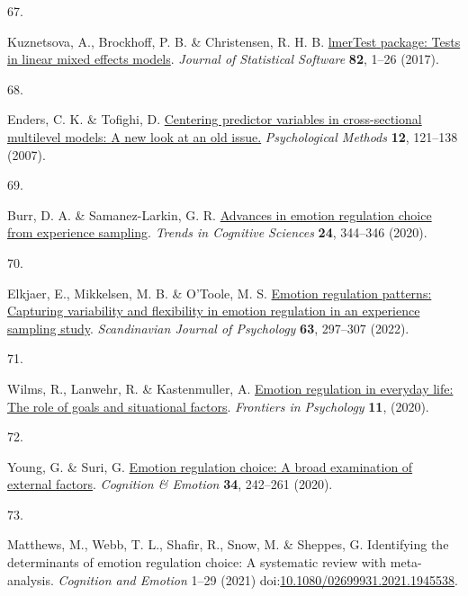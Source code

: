 \documentclass[
  man,floatsintext]{apa6}
\newlength{\cslhangindent}
\newlength{\csllabelwidth}
\newlength{\cslentryspacingunit} %
\newenvironment{CSLReferences}[2] %
 {%
  \setlength{\parindent}{0pt}
  \ifodd #1
  \let\oldpar\par
  \def\par{\hangindent=\cslhangindent\oldpar}
  \fi
  \setlength{\parskip}{#2\cslentryspacingunit}
 }%
 {}
\newcommand{\CSLLeftMargin}[1]{\parbox[t]{\csllabelwidth}{#1}}
\newcommand{\CSLRightInline}[1]{\parbox[t]{\linewidth - \csllabelwidth}{#1}\break}
\begin{document}
\begin{CSLReferences}{0}{0}
\leavevmode{}%
\CSLLeftMargin{67. }%
\CSLRightInline{Kuznetsova, A., Brockhoff, P. B. \& Christensen, R. H. B. \href{https://doi.org/10.18637/jss.v082.i13}{{lmerTest} package: Tests in linear mixed effects models}. \emph{Journal of Statistical Software} \textbf{82}, 1--26 (2017).}

\leavevmode{}%
\CSLLeftMargin{68. }%
\CSLRightInline{Enders, C. K. \& Tofighi, D. \href{https://doi.org/10.1037/1082-989x.12.2.121}{Centering predictor variables in cross-sectional multilevel models: {A} new look at an old issue.} \emph{Psychological Methods} \textbf{12}, 121--138 (2007).}

\leavevmode{}%
\CSLLeftMargin{69. }%
\CSLRightInline{Burr, D. A. \& Samanez-Larkin, G. R. \href{https://doi.org/10.1016/j.tics.2020.02.008}{Advances in emotion regulation choice from experience sampling}. \emph{Trends in Cognitive Sciences} \textbf{24}, 344--346 (2020).}

\leavevmode{}%
\CSLLeftMargin{70. }%
\CSLRightInline{Elkjaer, E., Mikkelsen, M. B. \& O'Toole, M. S. \href{https://doi.org/10.1111/sjop.12808}{Emotion regulation patterns: Capturing variability and flexibility in emotion regulation in an experience sampling study}. \emph{Scandinavian Journal of Psychology} \textbf{63}, 297--307 (2022).}

\leavevmode{}%
\CSLLeftMargin{71. }%
\CSLRightInline{Wilms, R., Lanwehr, R. \& Kastenmuller, A. \href{https://doi.org/ARTN\%20877\%0A10.3389/fpsyg.2020.00877}{Emotion regulation in everyday life: The role of goals and situational factors}. \emph{Frontiers in Psychology} \textbf{11}, (2020).}

\leavevmode{}%
\CSLLeftMargin{72. }%
\CSLRightInline{Young, G. \& Suri, G. \href{https://doi.org/10.1080/02699931.2019.1611544}{Emotion regulation choice: A broad examination of external factors}. \emph{Cognition \& Emotion} \textbf{34}, 242--261 (2020).}

\leavevmode{}%
\CSLLeftMargin{73. }%
\CSLRightInline{Matthews, M., Webb, T. L., Shafir, R., Snow, M. \& Sheppes, G. Identifying the determinants of emotion regulation choice: A systematic review with meta-analysis. \emph{Cognition and Emotion} 1--29 (2021) doi:\href{https://doi.org/10.1080/02699931.2021.1945538}{10.1080/02699931.2021.1945538}.}


\end{CSLReferences}
\end{document}
